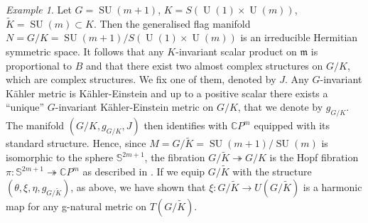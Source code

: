 \documentclass[a4paper,reqno]{amsart}
\theoremstyle{definition}
\theoremstyle{remark}
\newtheorem*{Example}{Example}
\theoremstyle{plain}
\numberwithin{equation}{section}
\newcommand{\C}{{\mathbb{C}}}
\newcommand{\fm}{{\mathfrak{m}}}
\newcommand{\sto}{\twoheadrightarrow}
\def\Unit{\operatorname {U}}
\def\Unit{\operatorname {U}}
\def\SU{\operatorname {SU}}
\newcommand{\Kt}{{\widetilde{K}}}
\newcommand{\wK}{{\widetilde{K}}}
\newcommand{\kahler}{K\"ahler\xspace}
\newcommand{\txeMK}{{(\theta,\xi,\eta,g_{\scriptscriptstyle{G/\wK}})}}
\begin{document}
\begin{Example}
Let $G= \SU(m+1)$, $K = S(\Unit(1)\times \Unit(m))$,  $\wK = \SU(m)
\subset K$.
Then the generalised flag manifold
$N=G/K = \SU(m+1)/S(\Unit(1)\times \Unit(m))$ is an irreducible  Hermitian
symmetric space. 
It follows that any $K$-invariant scalar product on $\fm$ is
proportional to $B$
and that there exist two almost complex structures on $G/K$, which
are complex structures.  We fix one of them, denoted by $J$. %
Any $G$-invariant \kahler metric is \kahler-Einstein and up to a
positive scalar there exists a ``unique'' $G$-invariant
\kahler-Einstein metric on $G/K$, that we denote by $g_{\scriptscriptstyle{G/K}}$. The
manifold $(G/K,g_{\scriptscriptstyle{G/K}},J)$ then identifies with $\C P^m$ equipped
with its standard structure.  Hence, since
$M=G/\Kt = \SU(m+1)/\SU(m)$ is isomorphic to the sphere
$\mathbb{S}^{2m+1}$, the fibration $G/\Kt \sto G/K$ is the Hopf
fibration $\pi : \mathbb{S}^{2m+1} \sto \C P^m$
as described in \cite[9.81]{Bes}. If we equip $G/\Kt$ with the structure
$\txeMK$, as above,  %
we have shown that $\xi : G/\Kt \to U(G/\Kt)$ is a harmonic map
for any g-natural metric on $T(G/\Kt)$.
\end{Example}
\end{document}

